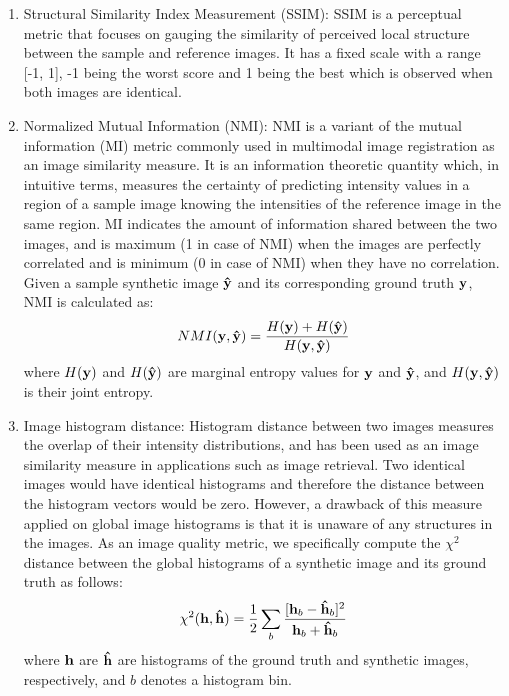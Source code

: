 \begin{enumerate}
    
    \item Structural Similarity Index Measurement (SSIM): SSIM \cite{wang2004image} is a perceptual metric that focuses on gauging the similarity of perceived local structure between the sample and reference images. It has a fixed scale with a range [-1, 1], -1 being the worst score and 1 being the best which is observed when both images are identical.
    
    \item Normalized Mutual Information (NMI): NMI \cite{studholme1999overlap} is a variant of the mutual information (MI) metric commonly used in multimodal image registration as an image similarity measure. It is an information theoretic quantity which, in intuitive terms, measures the certainty of predicting intensity values in a region of a sample image knowing the intensities of the reference image in the same region. MI indicates the amount of information shared between the two images, and is maximum (1 in case of NMI) when the images are perfectly correlated and is minimum (0 in case of NMI) when they have no correlation. Given a sample synthetic image $\vb{\hat{y}}$ and its corresponding ground truth $\vb{y}$, NMI is calculated as: 
    \begin{equation}
        NMI(\vb{y}, \vb{\hat{y}}) = \frac{H(\vb{y}) + H(\vb{\hat{y}})}{H(\vb{y}, \vb{\hat{y}})}
        \label{eq:metric_nmi}
    \end{equation}
    where $H(\vb{y})$ and $H(\vb{\hat{y}})$ are marginal entropy values for $\vb{y}$  and $\vb{\hat{y}}$, and $H(\vb{y}, \vb{\hat{y}})$ is their joint entropy.
    
    \item Image histogram distance: Histogram distance between two images measures the overlap of their intensity distributions, and has been used as an image similarity measure in applications such as image retrieval. Two identical images would have identical histograms and therefore the distance between the histogram vectors would be zero. However, a drawback of this measure applied on global image histograms is that it is unaware of any structures in the images. As an image quality metric, we specifically compute the $\chi^2$ distance between the global histograms of a synthetic image and its ground truth as follows: 
    \begin{equation}
        \chi^2(\vb{h}, \vb{\hat{h}}) = \frac{1}{2} \sum_{b} \frac{[\vb{h}_b - \vb{\hat{h}}_b]^2}{\vb{h}_b + \vb{\hat{h}}_b}
        \label{eq:metric_histogram}
    \end{equation}
    where $\vb{h}$ are $\vb{\hat{h}}$ are histograms of the ground truth and synthetic images, respectively, and $b$ denotes a histogram bin.
    
\end{enumerate}

